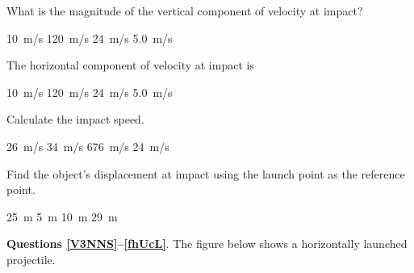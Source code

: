 \documentclass[../main-physics-workbook.tex]{subfiles}
\begin{document}
\begin{questions}
\question 
What is the magnitude of the vertical component of velocity at impact?

\begin{randomizechoices}
    \correctchoice \SI{10}{m/s}
    \choice \SI{120}{m/s}
    \choice \SI{24}{m/s}
    \choice \SI{5.0}{m/s}
\end{randomizechoices}

\question 
The horizontal component of velocity at impact is

\begin{randomizechoices}
    \choice \SI{10}{m/s}
    \choice \SI{120}{m/s}
    \correctchoice \SI{24}{m/s}
    \choice \SI{5.0}{m/s}
\end{randomizechoices}

\question
Calculate the impact speed.

\begin{randomizechoices}
    \correctchoice \SI{26}{m/s}
    \choice \SI{34}{m/s}
    \choice \SI{676}{m/s}
    \choice \SI{24}{m/s}
\end{randomizechoices}

\question \label{Gw5bh}
Find the object's displacement at impact using the launch point as the reference point.

\begin{randomizechoices}
    \correctchoice \SI{25}{m}
    \choice \SI{5}{m}
    \choice \SI{10}{m}
    \choice \SI{29}{m}
\end{randomizechoices}

\clearpage

\begin{EnvUplevel}
    \textbf{Questions \ref{V3NNS}--\ref{fhUcL}}. The figure below shows a horizontally launched projectile.

\begin{center}
\end{center}
\end{EnvUplevel}


\end{questions}
\end{document}
